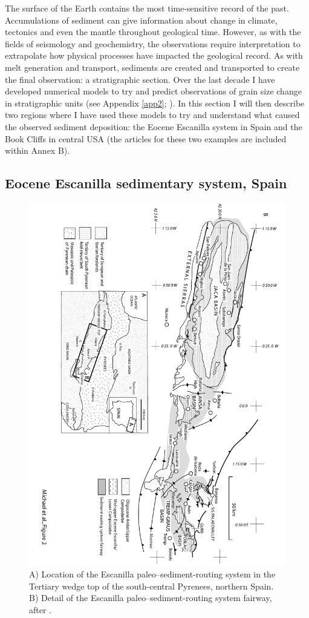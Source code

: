 The surface of the Earth contains the most time-sensitive record of the past. Accumulations of sediment can give information about change in climate, tectonics and even the mantle throughout geological time. However, as with the fields of seismology and geochemistry, the observations require interpretation to extrapolate how physical processes have impacted the geological record. As with melt generation and transport, sediments are created and transported to create the final observation: a stratigraphic section. Over the last decade I have developed numerical models to try and predict observations of grain size change in stratigraphic units (see Appendix \ref{app2}; \citealp{armitage-etal-ngeo-2011,armitage-etal-2015,armitage-etal-br-2018,armitage-2019}). In this section I will then describe two regions where I have used these models to try and understand what caused the observed sediment deposition: the Eocene Escanilla system in Spain and the Book Cliffs in central USA (the articles for these two examples are included within Annex B).

\subsection{Eocene Escanilla sedimentary system, Spain}

\begin{figure}
\includegraphics[height=\textwidth,angle=90]{./figures/ch2-escanilla-map.pdf}
\caption{A) Location of the Escanilla paleo--sediment-routing system in the Tertiary wedge top of the south-central Pyrenees, northern Spain. B) Detail of the Escanilla paleo--sediment-routing system fairway, after \cite{michael-etal-2014a}.}
\label{fg:escanilla-map}
\end{figure}

